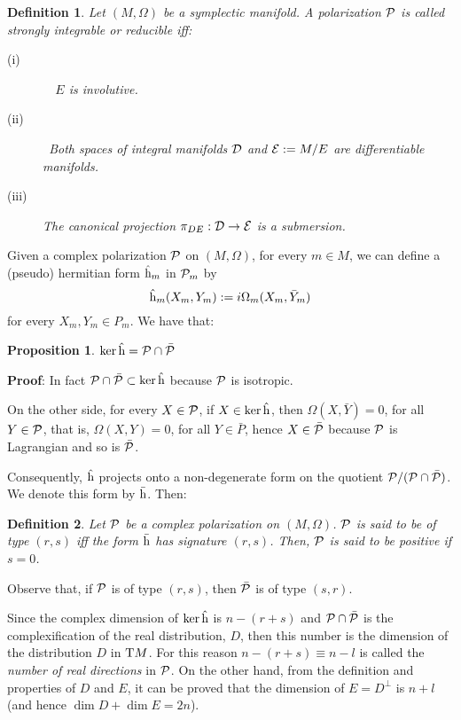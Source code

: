 \documentclass[12pt]{article}
\theoremstyle{plain}
\newtheorem{prop}{Proposition}
\newtheorem{definition}{Definition}
\def\beq{\begin{equation}}
\def\eeq{\end{equation}}
\def\qed{\ifvmode\removelastskip\fi
{\unskip\nobreak\hfil\penalty50\hbox{}\nobreak\hfil
\hbox{\vrule height1.2ex width1.2ex}\parfillskip=0pt
\finalhyphendemerits=0 \par\smallskip}}
\def\P{{\cal P}}
\def\D{{\cal D}}
\def\E{{\cal E}}
\def\h{{\rm h}}
\def\Tan{{\rm T}}
\begin{document}
\begin{definition}
Let $(M,\Omega )$ be a symplectic manifold.
A polarization ${\cal P}$ is called
{\rm strongly integrable} or {\rm reducible} iff:
\begin{description}
\item[{\rm (i)}]\ \
$E$ is involutive.
\item[{\rm (ii)}]\
Both spaces of integral manifolds
$\D$ and $\E := M/E$
are differentiable manifolds.
\item[{\rm (iii)}]
The canonical projection
$\pi_{DE} : \D \to \E$
is a submersion.
\end{description}
\label{sap}
\end{definition}

Given a complex polarization $\P$ on $(M,\Omega )$,
for every $m \in M$, we can define
a (pseudo) hermitian form $\hat \h_m$ in $\P_m$ by
\beq
\hat \h_m(X_m, Y_m) := i\Omega_m(X_m,\bar Y_m)
\label{hermm}
\eeq
for every $X_m,Y_m \in P_m$.
We have that:

\begin{prop}
$\ker \hat \h = \P \cap \bar \P$
\end{prop}
{\bf Proof}: 
In fact $\P \cap \bar\P \subset \ker \hat \h$ because $\P$ is isotropic.

On the other side, for every $X \in \P$, if $X \in \ker \hat \h$, then
$\Omega (X,\bar Y)=0$, for all $Y \in \P$,
that is, $\Omega (X,Y)=0$, for all $Y \in \bar P$,
hence $X \in \bar \P$ because $\P$ is Lagrangian
and so is $\bar \P$.
\qed

Consequently, $\hat \h$ projects onto a non-degenerate form
on the quotient $\P /(\P \cap \bar \P )$.
We denote this form by $\bar \h$. Then:

\begin{definition}
Let $\P$ be a complex polarization on $(M,\Omega )$.
$\P$ is said to be
{\rm of type $(r,s)$} iff
the form $\bar \h$ has signature $(r,s)$.
Then, $\P$ is said to be
{\rm positive} if $s=0$.
\label{typrs}
\end{definition}
Observe that, if $\P$ is of type $(r,s)$,
then $\bar \P$ is of type $(s,r)$.

Since the complex dimension of $\ker \hat \h$ is $n-(r+s)$
and $\P \cap \bar \P$ is the complexification of the real distribution,
$D$, then this number is the dimension of the distribution $D$ in $\Tan
M$.
For this reason $n-(r+s) \equiv n-l$ is called the
{\it number of real directions} in $\P$.
On the other hand, from the definition and properties
of $D$ and $E$, it can be proved that the dimension of $E=D^{\perp}$
is $n+l$ (and hence  $\dim D + \dim E = 2n$).
\end{document}
